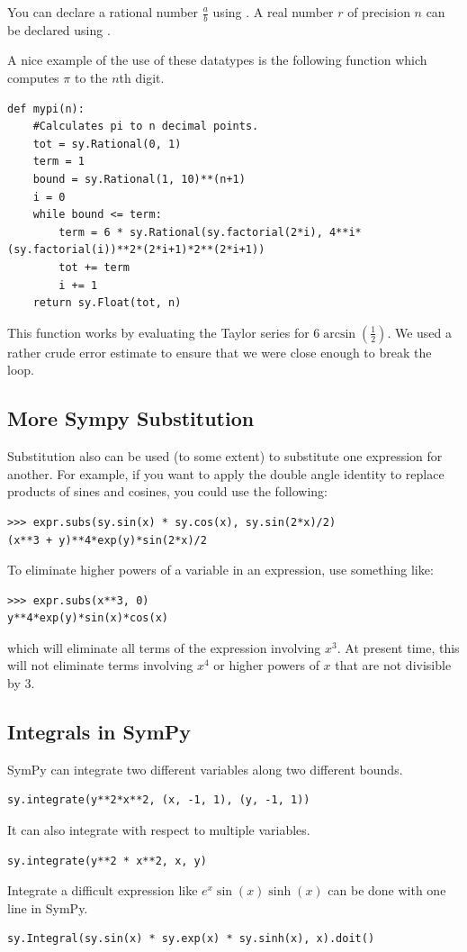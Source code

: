 You can declare a rational number $\frac{a}{b}$ using .
A real number $r$ of precision $n$ can be declared using .

A nice example of the use of these datatypes is the following function which computes $\pi$ to the $n$th digit.
\begin{lstlisting}
def mypi(n):
    #Calculates pi to n decimal points.
    tot = sy.Rational(0, 1)
    term = 1
    bound = sy.Rational(1, 10)**(n+1)
    i = 0
    while bound <= term:
        term = 6 * sy.Rational(sy.factorial(2*i), 4**i*(sy.factorial(i))**2*(2*i+1)*2**(2*i+1))
        tot += term
        i += 1
    return sy.Float(tot, n)
\end{lstlisting}
This function works by evaluating the Taylor series for $6\arcsin\left(\frac{1}{2}\right)$.
We used a rather crude error estimate to ensure that we were close enough to break the loop.


\subsection*{More Sympy Substitution}%
Substitution also can be used (to some extent) to substitute one expression for another.
For example, if you want to apply the double angle identity to replace products of sines and cosines, you could use the following:
\begin{lstlisting}
>>> expr.subs(sy.sin(x) * sy.cos(x), sy.sin(2*x)/2)
(x**3 + y)**4*exp(y)*sin(2*x)/2
\end{lstlisting}
To eliminate higher powers of a variable in an expression, use something like:
\begin{lstlisting}
>>> expr.subs(x**3, 0)
y**4*exp(y)*sin(x)*cos(x)
\end{lstlisting}
which will eliminate all terms of the expression involving $x^3$.
At present time, this will not eliminate terms involving $x^4$ or higher powers of $x$ that are not divisible by 3.

\subsection*{Integrals in SymPy}%

SymPy can integrate two different variables along two different bounds.
\begin{lstlisting}
sy.integrate(y**2*x**2, (x, -1, 1), (y, -1, 1))
\end{lstlisting}
It can also integrate with respect to multiple variables.
\begin{lstlisting}
sy.integrate(y**2 * x**2, x, y)
\end{lstlisting}
Integrate a difficult expression like $e^x\sin(x)\sinh(x)$ can be done with one line in SymPy.
\begin{lstlisting}
sy.Integral(sy.sin(x) * sy.exp(x) * sy.sinh(x), x).doit()
\end{lstlisting}

